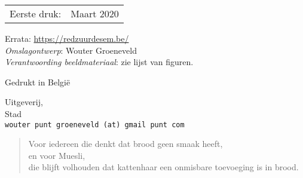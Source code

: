 \begin{center}
\begin{tabular}{ll}
Eerste druk:  & Maart 2020 \\
\end{tabular}
\end{center}

\vfill

Errata: \url{https://redzuurdesem.be/} \\

\hspace*{2em} \textit{Omslagontwerp}: Wouter Groeneveld \\
\hspace*{2em} \textit{Verantwoording beeldmateriaal}: zie lijst van figuren. \\

\vfill

Gedrukt in België

Uitgeverij, \\
Stad \\
\texttt{wouter punt groeneveld (at) gmail punt com}

\vspace*{2\baselineskip}


\clearpage

 \newenvironment{dedication}
     {\vspace{6ex}\begin{quotation}\begin{center}\begin{em}}
     {\par\end{em}\end{center}\end{quotation}}

\begin{dedication}
	Voor iedereen die denkt dat brood geen smaak heeft, \\
	en voor Muesli, \\
  die blijft volhouden dat kattenhaar een onmisbare toevoeging is in brood. 
\end{dedication}

\endgroup
\clearpage
\pagestyle{desem}
